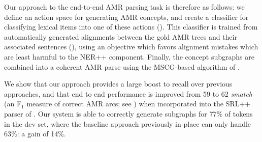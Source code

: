 \documentclass[11pt]{article}
\newcommand\n[1]{\textit{#1}} %
\begin{document}
%

Our approach to the end-to-end AMR parsing task is therefore as follows:
  we define an action space for generating AMR concepts, and create a classifier
  for classifying lexical items into one of these actions ().
This classifier is trained from automatically generated alignments between the
  gold AMR trees and their associated sentences (), using an
  objective which favors alignment mistakes which are least harmful to the NER++
  component.
Finally, the concept subgraphs are combined into a coherent AMR parse using the
  MSCG-based algorithm of .


We show that our approach provides a large boost to recall over previous approaches, and that end to end performance is improved from 59 to 62 \n{smatch} (an F$_1$ measure of correct AMR arcs; see \cite{cai2013smatch-amr}) when incorporated into the SRL++ parser of .
Our system is able to correctly generate subgraphs for 77\% of tokens in the dev set, where the baseline approach previously in place can only handle 63\%: a gain of 14\%.


\end{document}
